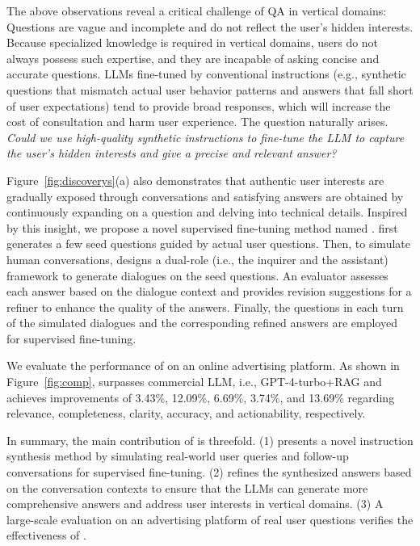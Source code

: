 The above observations reveal a critical challenge of QA in vertical domains: Questions are vague and incomplete and do not reflect the user's hidden interests. Because specialized knowledge is required in vertical domains, users do not always possess such expertise, and they are incapable of asking concise and accurate questions. LLMs fine-tuned by conventional instructions (e.g., synthetic questions that mismatch actual user behavior patterns and answers that fall short of user expectations) tend to provide broad responses, which will increase the cost of consultation and harm user experience. The question naturally arises. \textit{
Could we use high-quality synthetic instructions to fine-tune the LLM to capture the user's hidden interests and give a precise and relevant answer?} 

Figure~\ref{fig:discoverys}(a) also demonstrates that authentic user interests are gradually exposed through conversations and satisfying answers are obtained by continuously expanding on a question and delving into technical details. Inspired by this insight, we propose a novel supervised fine-tuning method named \ourmodel. \ourmodel first generates a few seed questions guided by actual user questions. Then, to simulate human conversations, \ourmodel designs a dual-role (i.e., the inquirer and the assistant) framework to generate dialogues on the seed questions. An evaluator assesses each answer based on the dialogue context and provides revision suggestions for a refiner to enhance the quality of the answers. Finally, the questions in each turn of the simulated dialogues and the corresponding refined answers are employed for supervised fine-tuning.

We evaluate the performance of \ourmodel on an online advertising platform. As shown in Figure~\ref{fig:comp}, \ourmodel surpasses commercial LLM, i.e., GPT-4-turbo+RAG and achieves improvements of 3.43\%, 12.09\%, 6.69\%, 3.74\%, and 13.69\% regarding relevance, completeness, clarity, accuracy, and actionability, respectively.

In summary, the main contribution of \ourmodel is threefold. (1) \ourmodel presents a novel instruction synthesis method by simulating real-world user queries and follow-up conversations for supervised fine-tuning. (2) \ourmodel refines the synthesized answers based on the conversation contexts to ensure that the LLMs can generate more comprehensive answers and address user interests in vertical domains. (3) A large-scale evaluation on an advertising platform of real user questions verifies the effectiveness of \ourmodel.    


